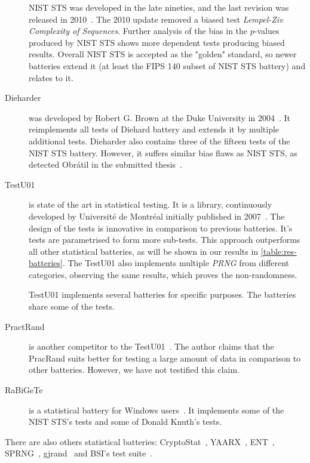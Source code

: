 \documentclass[
    digital,    %
    oneside,    %
    color,
    11pt,
    nocover,
    notable,
    nolof,
    nolot,
]{fithesis3}
\begin{document}
\begin{description}
    NIST STS was developed in the late nineties, and the last revision was released in 2010~\cite{rukhin2001statistical}. The 2010 update removed a biased test \textit{Lempel-Ziv Complexity of Sequences}. Further analysis of the bias in the $p$-values produced by NIST STS shows more dependent tests producing biased results. Overall NIST STS is accepted as the "golden" standard, so newer batteries extend it (at least the FIPS 140 subset of NIST STS battery) and relates to it. %
    \item[Dieharder] was developed by Robert G. Brown at the Duke University in 2004~\cite{brown2013dieharder}. It reimplements all tests of Diehard battery and extends it by multiple additional tests. Dieharder also contains three of the fifteen tests of the NIST STS battery. However, it suffers similar bias flaws as NIST STS, as detected Obrátil in the submitted thesis~\cite{obratilMgrThesis}. %
    \item[TestU01] is state of the art in statistical testing. It is a library, continuously developed by Université de Montréal initially published in 2007~\cite{l2007testu01}. The design of the tests is innovative in comparison to previous batteries. It's tests are parametrised to form more sub-tests. This approach outperforms all other statistical batteries, as will be shown in our results in \cref{table:res-batteries}. The TestU01 also implements multiple \textit{PRNG} from different categories, observing the same results, which proves the non-randomness. %

    TestU01 implements several batteries for specific purposes. The batteries share some of the tests.
    \item[PractRand] is another competitor to the TestU01~\cite{dotypractically}. The author claims that the PracRand suits better for testing a large amount of data in comparison to other batteries. However, we have not testified this claim.
    \item[RaBiGeTe] is a statistical battery for Windows users~\cite{rabigete}. It implements some of the NIST STS's tests and some of Donald Knuth's tests.
\end{description}

There are also others statistical batteries: CryptoStat~\cite{kaminsky2013cryptostat}, YAARX~\cite{biryukov2014automatic}, ENT~\cite{walker2008ent}, SPRNG~\cite{mascagni2000algorithm}, gjrand~\cite{gjrand} and BSI's test suite~\cite{schindler2002evaluation}.

\end{document}
